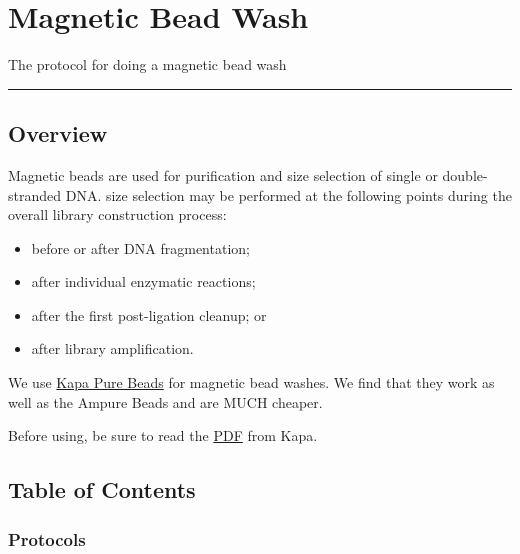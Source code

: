 \documentclass[
  letterpaper,
  DIV=11,
  numbers=noendperiod]{scrreprt}
\begin{document}
\hypertarget{magnetic-bead-wash}{%
\chapter{Magnetic Bead Wash}\label{magnetic-bead-wash}}

The protocol for doing a magnetic bead wash

\begin{center}\rule{0.5\linewidth}{0.5pt}\end{center}

\hypertarget{overview-1}{%
\section*{\texorpdfstring{\textbf{Overview}}{Overview}}\label{overview-1}}


Magnetic beads are used for purification and size selection of single or
double-stranded DNA. size selection may be performed at the following
points during the overall library construction process:

\begin{itemize}
\item
  before or after DNA fragmentation;
\item
  after individual enzymatic reactions;
\item
  after the first post-ligation cleanup; or
\item
  after library amplification.
\end{itemize}

We use
\href{https://www.kapabiosystems.com/document/kapa-pure-beads-tds/?dl=1}{Kapa
Pure Beads} for magnetic bead washes. We find that they work as well as
the Ampure Beads and are MUCH cheaper.

Before using, be sure to read the
\href{https://www.kapabiosystems.com/document/kapa-pure-beads-tds/?dl=1}{PDF}
from Kapa.

\hypertarget{table-of-contents}{%
\section*{\texorpdfstring{\textbf{Table of
Contents}}{Table of Contents}}\label{table-of-contents}}


\hypertarget{protocols}{%
\subsection*{\texorpdfstring{\textbf{Protocols}}{Protocols}}\label{protocols}}
\end{document}
